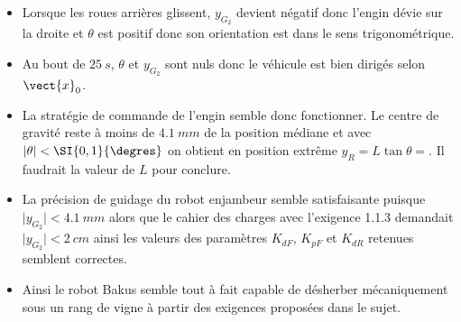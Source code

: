 \documentclass[11pt]{article}
\begin{document}
\begin{UPSTIcorrige}
\begin{itemize}
\item Lorsque les roues arrières glissent, $y_{G_2}$ devient négatif donc l'engin dévie sur la droite et $\theta$ est positif donc son orientation est dans le sens trigonométrique.
\item Au bout de $\SI{25}{s}$, $\theta$ et $y_{G_2}$ sont nuls donc le véhicule est bien dirigés selon $\vect{x}_0$.
\item La stratégie de commande de l'engin semble donc fonctionner. Le centre de gravité reste à moins de $\SI{4,1}{mm}$ de la position médiane et avec $\vert\theta\vert<\SI{0,1}{\degres}$ on obtient en position extrême $y_R=L\tan \theta=$. Il faudrait la valeur de $L$ pour conclure.
\item La précision de guidage du robot enjambeur semble satisfaisante puisque $\vert y_{G_2}\vert <\SI{4,1}{mm}$ alors que le cahier des charges avec l'exigence 1.1.3 demandait $\vert y_{G_2}\vert<\SI{2}{cm}$ ainsi les valeurs des paramètres $K_{dF}$, $K_{pF}$ et $K_{dR}$ retenues semblent correctes.
\item Ainsi le robot Bakus semble tout à fait capable de désherber mécaniquement sous un rang de vigne à partir des exigences proposées dans le sujet.
\end{itemize}
\end{UPSTIcorrige}




%
%
%
%
%
%
%
%
%
%
%
%
%
%
\end{document}
